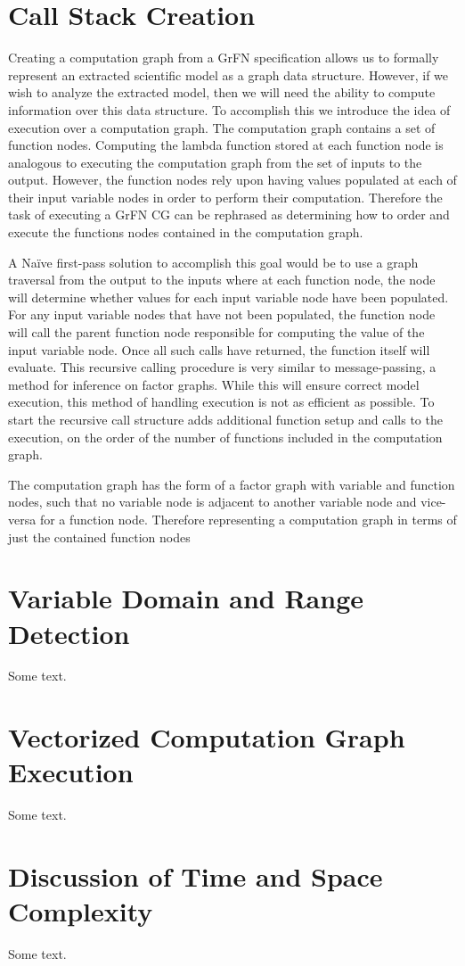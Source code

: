 \section{Call Stack Creation\label{sec:call_stack}}

Creating a computation graph from a GrFN specification allows us to formally represent an extracted scientific model as a graph data structure. However, if we wish to analyze the extracted model, then we will need the ability to compute information over this data structure. To accomplish this we introduce the idea of execution over a computation graph. The computation graph contains a set of function nodes. Computing the lambda function stored at each function node is analogous to executing the computation graph from the set of inputs to the output. However, the function nodes rely upon having values populated at each of their input variable nodes in order to perform their computation. Therefore the task of executing a GrFN CG can be rephrased as determining how to order and execute the functions nodes contained in the computation graph.

A Naïve first-pass solution to accomplish this goal would be to use a graph traversal from the output to the inputs where at each function node, the node will determine whether values for each input variable node have been populated. For any input variable nodes that have not been populated, the function node will call the parent function node responsible for computing the value of the input variable node. Once all such calls have returned, the function itself will evaluate. This recursive calling procedure is very similar to message-passing, a method for inference on factor graphs. While this will ensure correct model execution, this method of handling execution is not as efficient as possible. To start the recursive call structure adds additional function setup and calls to the execution, on the order of the number of functions included in the computation graph.

The computation graph has the form of a factor graph with variable and function nodes, such that no variable node is adjacent to another variable node and vice-versa for a function node. Therefore representing a computation graph in terms of just the contained function nodes

\section{Variable Domain and Range Detection\label{sec:var_domain_range}}
Some text.

\section{Vectorized Computation Graph Execution\label{sec:cg_execution}}
Some text.

\section{Discussion of Time and Space Complexity\label{sec:cg_complexity}}
Some text.
